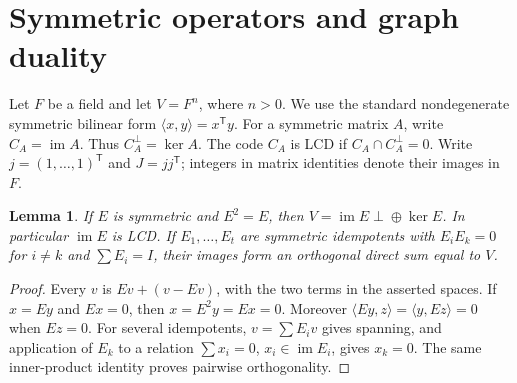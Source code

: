 \documentclass[11pt,a4paper]{article}
\newtheorem{lemma}[theorem]{Lemma}
\numberwithin{equation}{section}
\newcommand{\im}{\operatorname{im}}
\begin{document}
\section{Symmetric operators and graph duality}

Let $F$ be a field and let $V=F^n$, where $n>0$. We use the standard
nondegenerate symmetric bilinear form $\langle x,y\rangle=x^{\mathsf T}y$.
For a symmetric matrix $A$, write $C_A=\im A$. Thus $C_A^\perp=\ker A$.
The code $C_A$ is LCD if $C_A\cap C_A^\perp=0$.
Write $j=(1,\ldots,1)^{\mathsf T}$ and $J=jj^{\mathsf T}$; integers in matrix
identities denote their images in $F$.

\begin{lemma}\label{ULCD.Projector}
If $E$ is symmetric and $E^2=E$, then
$V=\im E\mathbin{\perp\!\oplus}\ker E$.
In particular $\im E$ is LCD. If $E_1,\ldots,E_t$ are symmetric idempotents
with $E_iE_k=0$ for $i\ne k$ and $\sum E_i=I$, their images form an
orthogonal direct sum equal to $V$.
\end{lemma}
\begin{proof}
Every $v$ is $Ev+(v-Ev)$, with the two terms in the asserted spaces.
If $x=Ey$ and $Ex=0$, then $x=E^2y=Ex=0$. Moreover
$\langle Ey,z\rangle=\langle y,Ez\rangle=0$ when $Ez=0$.
For several idempotents, $v=\sum E_iv$ gives spanning, and application of
$E_k$ to a relation $\sum x_i=0$, $x_i\in\im E_i$, gives $x_k=0$.
The same inner-product identity proves pairwise orthogonality.
\end{proof}
\end{document}
